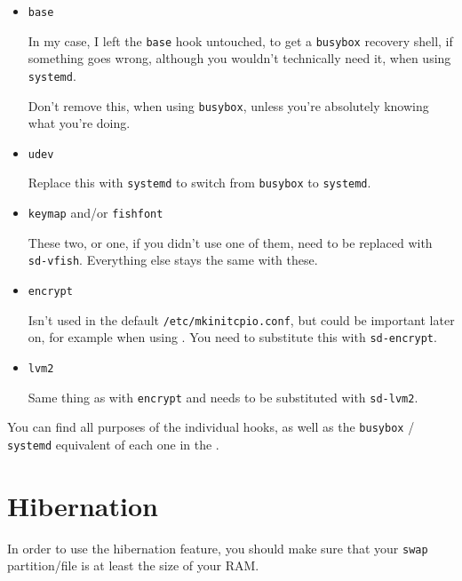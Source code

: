 \documentclass[10pt]{dustdoc}
\begin{document}
\begin{itemize}
    \item \texttt{base}

        In my case, I left the \texttt{base} hook untouched, to get a \texttt{busybox} recovery shell, if something goes wrong, although you wouldn’t technically need it, when using \texttt{systemd}.

        \begin{WARNING}
            Don’t remove this, when using \texttt{busybox}, unless you’re absolutely knowing what you’re doing.
        \end{WARNING}

    \item \texttt{udev}

        Replace this with \texttt{systemd} to switch from \texttt{busybox} to \texttt{systemd}.

    \item \texttt{keymap} and/or \texttt{fishfont}

        These two, or one, if you didn’t use one of them, need to be replaced with \texttt{sd-vfish}.
        Everything else stays the same with these.

    \item \texttt{encrypt}

        Isn’t used in the default \texttt{/etc/mkinitcpio.conf}, but could be important later on, for example when using .
        You need to substitute this with \texttt{sd-encrypt}.

    \item \texttt{lvm2}

        Same thing as with \texttt{encrypt} and needs to be substituted with \texttt{sd-lvm2}.
\end{itemize}

\begin{NOTE}
    You can find all purposes of the individual hooks, as well as the \texttt{busybox} / \texttt{systemd} equivalent of each one in the .
\end{NOTE}

\section{Hibernation}%
\label{sec:hibernation}

In order to use the hibernation feature, you should make sure that your \texttt{swap} partition/file is at least the size of your RAM.\@
\end{document}
